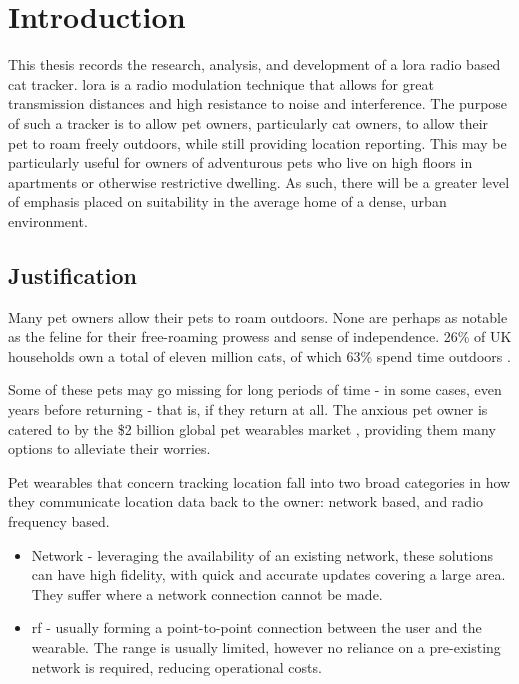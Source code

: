 

\section{Introduction}

This thesis records the research, analysis, and development of a \gls{lora} radio based 
cat tracker. \gls{lora} is a radio modulation technique that allows for great transmission 
distances and high resistance to noise and interference.
The purpose of such a tracker is to allow pet owners, particularly cat owners,
to allow their pet to roam freely outdoors, while still providing location reporting. 
This may be particularly useful for owners of adventurous pets who live on high floors in 
apartments or otherwise restrictive dwelling. As such, there will be a greater level of emphasis 
placed on suitability in the average home of a dense, urban environment.  

\subsection{Justification}
Many pet owners allow their pets to roam outdoors. None are perhaps as notable as 
the feline for their free-roaming prowess and sense of independence. 
26\% of UK households own a total of eleven million cats, 
of which 63\% spend time outdoors \cite{catsprotection:catsreport}.

Some of these pets may go missing for long periods of time - in some cases, even years
before returning \cite{bbc:missingcat} - that is, if they return at all. 
The anxious pet owner is catered to by the \$2 billion global pet 
wearables market \cite{researchandmarkets:wearablemarket}, providing them many 
options to alleviate their worries. 

Pet wearables that concern tracking location fall into two broad categories
in how they communicate location data back to the owner: 
network based, and radio frequency based. 
\begin{itemize}
    \item Network - leveraging the availability of an existing network, these solutions can have 
            high fidelity, with quick and accurate updates covering a large area. 
            They suffer where a network connection cannot be made.
    \item \acrshort{rf} - usually forming a point-to-point connection between the user and 
            the wearable. The range is usually limited, however no reliance on a pre-existing 
            network is required, reducing operational costs. 
\end{itemize}

